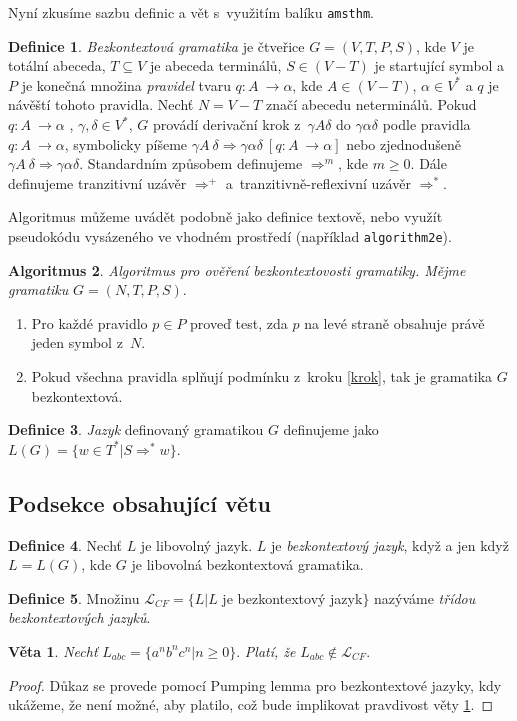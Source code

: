 \documentclass[11pt, a4paper, twocolumn, czech]{article}
\theoremstyle{definition}
\newtheorem{defin}{Definice}[section]
\newtheorem{algo}[defin]{Algoritmus}
\newtheorem{veta}{Věta}
\begin{document}
Nyní zkusíme sazbu definic a vět s~využitím balíku \texttt{amsthm}.
\begin{defin}
\label{Definice} \emph{Bezkontextová gramatika} je čtveřice $G=(V,T,P,S)$, kde $V$ je totální abeceda,
$T\subseteq V$ je abeceda terminálů, $S\in (V-T)$ je startující symbol a $P$ je konečná množina \emph{pravidel}
tvaru $q\!: A~\rightarrow \alpha$, kde $A \in (V-T)$, $\alpha \in V^*$ a $q$ je návěští tohoto pravi\-dla. Nechť $N=V-T$ značí abecedu neterminálů.
Po\-kud $q\!: A~\rightarrow \alpha$ , $\gamma, \delta \in V^*$, $G$ provádí derivační krok z~$\gamma A\delta$ do $\gamma \alpha \delta$ podle pravidla $q\!: A~\rightarrow \alpha$, sym\-bolicky píšeme 
$\gamma A~\delta \Rightarrow \gamma \alpha \delta\ [q\!: A~\rightarrow \alpha]$ nebo zjed\-nodušeně $\gamma A~\delta \Rightarrow \gamma \alpha \delta$. Standardním způsobem definu\-jeme $\Rightarrow^m$, kde $m \geq 0$. Dále definujeme tranzitivní uzávěr $\Rightarrow^+$ a~tranzitivně-reflexivní uzávěr $\Rightarrow^*$.
\end{defin}
Algoritmus můžeme uvádět podobně jako definice textově, nebo využít pseudokódu vysázeného ve vhodném prostředí (například \texttt{algorithm2e}).
\begin{algo}
\label{Algoritmus} \emph{Algoritmus pro ověření bezkontextovosti gramatiky. Mějme gramatiku} $G = (N, T, P, S)$.
\begin{enumerate} 
\itshape \item \label{krok}Pro každé pravidlo $p \in P$ proveď test, zda $p$ na levé straně obsahuje právě jeden symbol z~$N$.
\itshape \item Pokud všechna pravidla splňují podmínku z~kroku \ref{krok}, tak je gramatika $G$ bezkontextová.
\end{enumerate}
\end{algo}
\begin{defin}
\emph{Jazyk} definovaný gramatikou $G$ definujeme jako $L(G)=\{w \in T^* | S\Rightarrow^*w \}$.
\end{defin}
\subsection{Podsekce obsahující větu}
\begin{defin}
Nechť $L$ je libovolný jazyk. $L$ je \emph{bezkontextový jazyk}, když a jen když $L=L(G)$, kde $G$ je libovolná bezkontextová gramatika.
\end{defin}
\begin{defin}
Množinu $\mathcal{L}_{CF}=\{L|L$ je bezkontextový jazyk$\}$ nazýváme \emph{třídou bezkontextových jazyků}.
\end{defin}
\begin{veta}
\label{veta1} \emph{Nechť} $L_{abc}=\{a^nb^nc^n|n \geq 0\}$. \emph{Platí, že} $L_{abc} \notin \mathcal{L}_{CF}$.
\end{veta} 
\begin{proof}
Důkaz se provede pomocí Pumping lemma pro bezkontextové jazyky, kdy ukážeme, že není možné, aby platilo, což bude implikovat pravdivost věty \ref{veta1}.
\end{proof}
\end{document}

